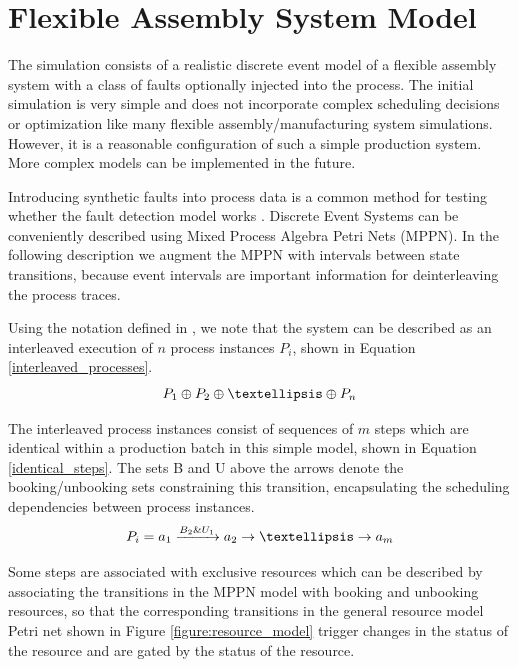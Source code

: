 \documentclass[journal]{IEEEtran}
\begin{document}
\section{Flexible Assembly System Model}

The simulation consists of a realistic discrete event model of a flexible assembly system with a class of faults optionally injected into the process.
The initial simulation is very simple and does not incorporate complex scheduling decisions or optimization like many flexible assembly/manufacturing system simulations\cite{donath1988flexible}.
However, it is a reasonable configuration of such a simple production system. More complex models can be implemented in the future.

Introducing synthetic faults into process data is a common method for testing whether the fault detection model works \cite{able2016model}.
Discrete Event Systems can be conveniently
described using Mixed Process Algebra Petri Nets (MPPN)\cite{falkman2001modeling}. In the following description we augment the MPPN with intervals between state transitions,
because event intervals are important information for deinterleaving the process traces.

Using the notation defined in \cite{falkman2001combined}, we note that the system can be described as an interleaved execution of $ n $ process instances $ P_i $, shown in
Equation \ref{interleaved_processes}.
\begin{equation}
 P_1 \oplus P_2 \oplus \textellipsis \oplus P_n
 \label{interleaved_processes}
\end{equation}

The interleaved process instances consist of sequences of $ m $ steps which are identical within a production batch in this simple model, shown in Equation \ref{identical_steps}.
The sets B and U above the arrows denote the booking/unbooking sets constraining this transition, encapsulating the scheduling dependencies between process instances.
\begin{equation}
 P_i = a_1 \xrightarrow{B_2 \& U_1} a_2 \rightarrow \textellipsis \rightarrow a_m
 \label{identical_steps}
\end{equation}

Some steps are associated with exclusive resources which can be described by associating the transitions in the MPPN model with booking and unbooking resources, so that
the corresponding transitions in the general resource model Petri net shown in Figure \ref{figure:resource_model} trigger changes in the status of the resource and
are gated by the status of the resource.
\end{document}
